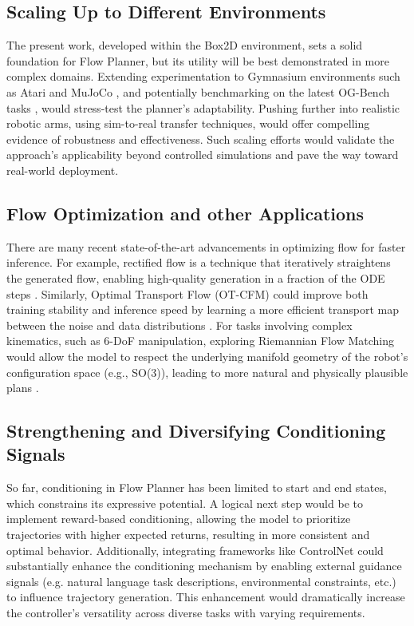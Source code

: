 \subsection{Scaling Up to Different Environments}
The present work, developed within the Box2D environment, sets a solid foundation for Flow Planner, but its utility will be best demonstrated in more complex domains. Extending experimentation to Gymnasium environments such as Atari and MuJoCo \cite{todorov2012mujoco},  and potentially benchmarking on the latest OG-Bench tasks \cite{parkOGBenchBenchmarkingOffline2025}, would stress-test the planner’s adaptability. Pushing further into realistic robotic arms, using sim-to-real transfer techniques, would offer compelling evidence of robustness and effectiveness. Such scaling efforts would validate the approach’s applicability beyond controlled simulations and pave the way toward real-world deployment.

\subsection{Flow Optimization and other Applications}
There are many recent state-of-the-art advancements in optimizing flow for faster inference. For example, rectified flow is a technique that iteratively straightens the generated flow, enabling high-quality generation in a fraction of the ODE steps \cite{liuFlowStraightFast2022}. Similarly, Optimal Transport Flow (OT-CFM) could improve both training stability and inference speed by learning a more efficient transport map between the noise and data distributions \cite{tongImprovingGeneralizingFlowbased2024}. For tasks involving complex kinematics, such as 6-DoF manipulation, exploring Riemannian Flow Matching would allow the model to respect the underlying manifold geometry of the robot's configuration space (e.g., SO(3)), leading to more natural and physically plausible plans \cite{lipmanFlowMatchingGuide2024a}.

\subsection{Strengthening and Diversifying Conditioning Signals}
So far, conditioning in Flow Planner has been limited to start and end states, which constrains its expressive potential. A logical next step would be to implement reward-based conditioning, allowing the model to prioritize trajectories with higher expected returns, resulting in more consistent and optimal behavior. Additionally, integrating frameworks like ControlNet \cite{zhangAddingConditionalControl2023} could substantially enhance the conditioning mechanism by enabling external guidance signals (e.g. natural language task descriptions, environmental constraints, etc.) to influence trajectory generation. This enhancement would dramatically increase the controller's versatility across diverse tasks with varying requirements.

